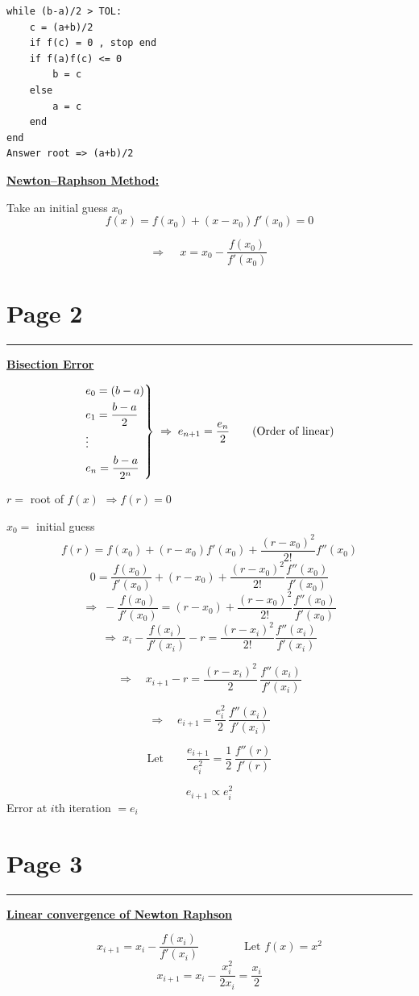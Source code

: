 \documentclass[11pt,a4paper]{article}
\newcommand{\pagehead}[1]{%
  \clearpage
  \section*{Page #1}
  \vspace{-0.6em}
  {\color{black!45}\rule{\linewidth}{0.5pt}}
  \vspace{0.4em}
}
\begin{document}
\begin{verbatim}
while (b-a)/2 > TOL:
    c = (a+b)/2
    if f(c) = 0 , stop end
    if f(a)f(c) <= 0
        b = c
    else
        a = c
    end
end
Answer root => (a+b)/2
\end{verbatim}

\textbf{\underline{Newton--Raphson Method:}}

Take an initial guess $x_0$
\[
f(x)=f(x_0)+(x-x_0)f'(x_0)=0
\]
\begin{handbox}
\[
\Rightarrow\quad \boxed{\,x=x_0-\frac{f(x_0)}{f'(x_0)}\,}
\]
\end{handbox}

\pagehead{2}

\textbf{\underline{Bisection Error}}

\[
\begin{rcases}
e_0=(b-a)\\
e_1=\dfrac{b-a}{2}\\
\vdots\\
e_n=\dfrac{b-a}{2^n}
\end{rcases}
\;\Rightarrow\; e_{n+1}=\frac{e_n}{2}
\qquad\text{(Order of linear)}
\]

$r=$ root of $f(x)$ $\Rightarrow f(r)=0$

$x_0=$ initial guess
\[
f(r)=f(x_0)+(r-x_0)f'(x_0)+\frac{(r-x_0)^2}{2!}f''(x_0)
\]
\[
0=\frac{f(x_0)}{f'(x_0)}+(r-x_0)+\frac{(r-x_0)^2}{2!}\frac{f''(x_0)}{f'(x_0)}
\]
\[
\Rightarrow\; -\frac{f(x_0)}{f'(x_0)}=(r-x_0)+\frac{(r-x_0)^2}{2!}\frac{f''(x_0)}{f'(x_0)}
\]
\[
\Rightarrow\; x_i-\frac{f(x_i)}{f'(x_i)}-r=\frac{(r-x_i)^2}{2!}\frac{f''(x_i)}{f'(x_i)}
\]
\begin{handbox}
\[
\Rightarrow\quad x_{i+1}-r=\frac{(r-x_i)^2}{2}\,\frac{f''(x_i)}{f'(x_i)}
\]
\end{handbox}
\begin{handbox}
\[
\Rightarrow\quad e_{i+1}=\frac{e_i^2}{2}\,\frac{f''(x_i)}{f'(x_i)}
\]
\end{handbox}
\begin{handbox}
\[
\text{Let}\qquad \frac{e_{i+1}}{e_i^2}=\frac12\,\frac{f''(r)}{f'(r)}
\]
\end{handbox}
\[
e_{i+1}\propto e_i^2
\]
Error at $i$th iteration $=e_i$

\pagehead{3}

\textbf{\underline{Linear convergence of Newton Raphson}}

\[
x_{i+1}=x_i-\frac{f(x_i)}{f'(x_i)}
\qquad\qquad \text{Let } f(x)=x^2
\]
\[
x_{i+1}=x_i-\frac{x_i^2}{2x_i}=\frac{x_i}{2}
\]
\end{document}

